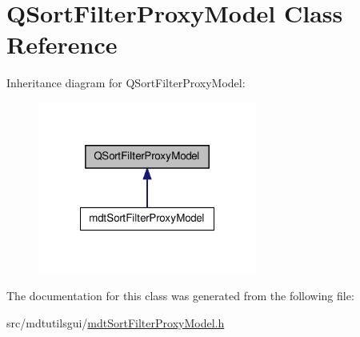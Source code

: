 \hypertarget{class_q_sort_filter_proxy_model}{\section{Q\-Sort\-Filter\-Proxy\-Model Class Reference}
\label{class_q_sort_filter_proxy_model}
}


Inheritance diagram for Q\-Sort\-Filter\-Proxy\-Model\-:\nopagebreak
\begin{figure}[H]
\begin{center}
\leavevmode
\includegraphics[width=204pt]{class_q_sort_filter_proxy_model__inherit__graph}
\end{center}
\end{figure}


The documentation for this class was generated from the following file\-:\begin{DoxyCompactItemize}
\item 
src/mdtutilsgui/\hyperlink{mdt_sort_filter_proxy_model_8h}{mdt\-Sort\-Filter\-Proxy\-Model.\-h}\end{DoxyCompactItemize}
